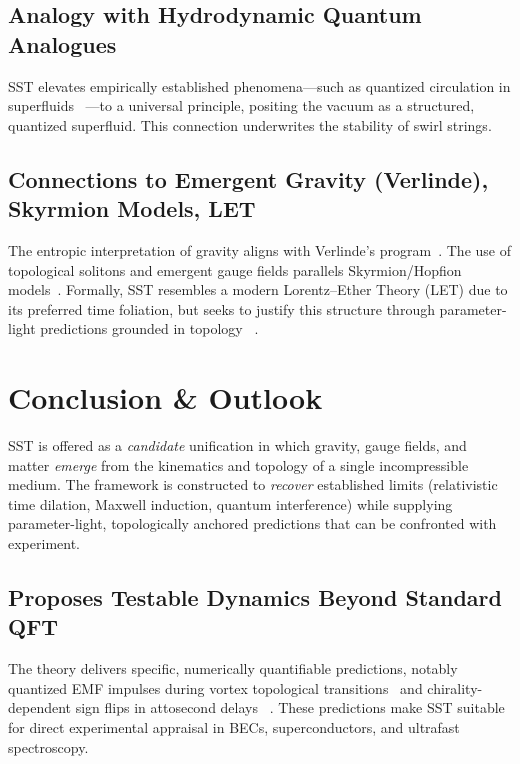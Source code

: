 \documentclass[10pt,reprint,aps,onecolumn,nofootinbib]{revtex4-2}
\begin{document}
    \subsection*{Analogy with Hydrodynamic Quantum Analogues}
        SST elevates empirically established phenomena—such as quantized circulation in superfluids~ \cite{sstCanon}—to a universal principle, positing the vacuum as a structured, quantized superfluid. This connection underwrites the stability of swirl strings.

    \subsection*{Connections to Emergent Gravity (Verlinde), Skyrmion Models, LET}
        The entropic interpretation of gravity aligns with Verlinde’s program~\cite{chiralSwirl, Verlinde2011,Verlinde2017,Jacobson1995}. The use of topological solitons and emergent gauge fields parallels Skyrmion/Hopfion models~\cite{sstLagrangian,Skyrme1962,MantonSutcliffe2004}. Formally, SST resembles a modern Lorentz–Ether Theory (LET) due to its preferred time foliation, but seeks to justify this structure through parameter-light predictions grounded in topology~ \cite{sstLagrangian}.

\section{Conclusion \& Outlook}\label{sec:conclusion}
SST is offered as a \emph{candidate} unification in which gravity, gauge fields, and matter \emph{emerge} from the kinematics and topology of a single incompressible medium. The framework is constructed to \emph{recover} established limits (relativistic time dilation, Maxwell induction, quantum interference) while supplying parameter-light, topologically anchored predictions that can be confronted with experiment.

    \subsection*{Proposes Testable Dynamics Beyond Standard QFT}
        The theory delivers specific, numerically quantifiable predictions, notably quantized EMF impulses during vortex topological transitions~ \cite{EM_G} and chirality-dependent sign flips in attosecond delays~ \cite{sstAttosecondPhotoionization}. These predictions make SST suitable for direct experimental appraisal in BECs, superconductors, and ultrafast spectroscopy.
\end{document}
